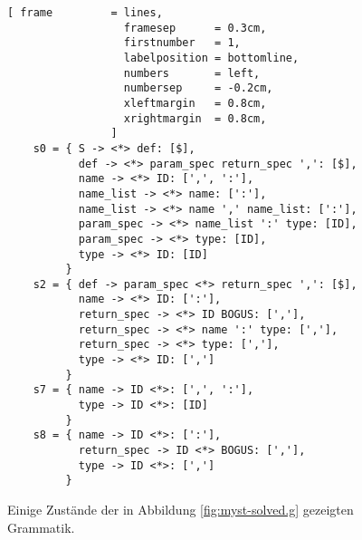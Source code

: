 \begin{figure}[!ht]
\centering
\begin{Verbatim}[ frame         = lines, 
                  framesep      = 0.3cm, 
                  firstnumber   = 1,
                  labelposition = bottomline,
                  numbers       = left,
                  numbersep     = -0.2cm,
                  xleftmargin   = 0.8cm,
                  xrightmargin  = 0.8cm,
                ]
    s0 = { S -> <*> def: [$],
           def -> <*> param_spec return_spec ',': [$],
           name -> <*> ID: [',', ':'],
           name_list -> <*> name: [':'],
           name_list -> <*> name ',' name_list: [':'],
           param_spec -> <*> name_list ':' type: [ID],
           param_spec -> <*> type: [ID],
           type -> <*> ID: [ID]
         }    
    s2 = { def -> param_spec <*> return_spec ',': [$],
           name -> <*> ID: [':'],
           return_spec -> <*> ID BOGUS: [','],
           return_spec -> <*> name ':' type: [','],
           return_spec -> <*> type: [','],
           type -> <*> ID: [',']
         }
    s7 = { name -> ID <*>: [',', ':'],
           type -> ID <*>: [ID]
         }    
    s8 = { name -> ID <*>: [':'],
           return_spec -> ID <*> BOGUS: [','],
           type -> ID <*>: [',']
         }
\end{Verbatim}
\vspace*{-0.3cm} %
\caption{Einige Zust\"ande der in Abbildung \ref{fig:myst-solved.g} gezeigten Grammatik.}
\label{fig:myst-solved.txt}
\end{figure}


